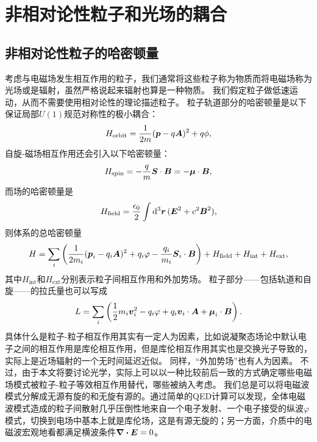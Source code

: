 \section{非相对论性粒子和光场的耦合}\label{sec:em-field-coupling-particle}

\subsection{非相对论性粒子的哈密顿量}\label{sec:particle-hamiltonian}

考虑与电磁场发生相互作用的粒子，我们通常将这些粒子称为物质而将电磁场称为光场或是辐射，虽然严格说起来辐射也算是一种物质。
我们假定粒子做低速运动，从而不需要使用相对论性的理论描述粒子。
粒子轨道部分的哈密顿量是以下保证局部$U(1)$规范对称性的极小耦合：
\begin{equation}
    {H}_\text{orbit} = \frac{1}{2m} ({\vb*{p}} - q \vb*{A})^2 + q \phi,
    \label{eq:minimal-coupling}
\end{equation}
自旋-磁场相互作用还会引入以下哈密顿量：
\begin{equation}
    {H}_\text{spin} = - \frac{q}{m} {\vb*{S}} \cdot \vb*{B} = - \vb*{\mu} \cdot \vb*{B},
\end{equation}
而场的哈密顿量是
\begin{equation}
    {H}_\text{field} = \frac{\epsilon_0}{2} \int \dd[3]{\vb*{r}} (\vb*{E}^2 + c^2 \vb*{B}^2),
\end{equation}
则体系的总哈密顿量
\begin{equation}
    {H} = \sum_i \left( \frac{1}{2m_i} ({\vb*{p}_i} - q_i \vb*{A})^2 + q_i \varphi - \frac{q_i}{m_i} \vb*{S}_i \cdot \vb*{B} \right) + {H}_\text{field} + {H}_\text{int} + {H}_\text{ext},
    \label{eq:whole-system-hamiltonian}
\end{equation}
其中${H}_\text{int}$和${H}_\text{ext}$分别表示粒子间相互作用和外加势场。
粒子部分——包括轨道和自旋——的拉氏量也可以写成
\begin{equation}
    L = \sum_i \left( \frac{1}{2} m_i \vb*{v}_i^2 - q_i \varphi + q_i \vb*{v}_i \cdot \vb*{A} + \vb*{\mu}_i \cdot \vb*{B} \right).
\end{equation}
具体什么是粒子-粒子相互作用其实有一定人为因素，比如说凝聚态场论中默认电子之间的相互作用是库伦相互作用，但是库伦相互作用其实也是交换光子导致的，实际上是近场辐射的一个无时间延迟近似。
同样，“外加势场”也有人为因素。
不过，由于本文将要讨论光学，实际上可以以一种比较前后一致的方式确定哪些电磁场模式被粒子-粒子等效相互作用替代，哪些被纳入考虑。
我们总是可以将电磁波模式分解成无源有旋的和无旋有源的。通过简单的QED计算可以发现，全体电磁波模式造成的粒子间散射几乎压倒性地来自一个电子发射、一个电子接受的纵波$\varphi$模式，切换到电场中基本上就是库伦场，这是有源无旋的；另一方面，介质中的电磁波宏观地看都满足横波条件$\div{\vb*{E}}=0$。%
